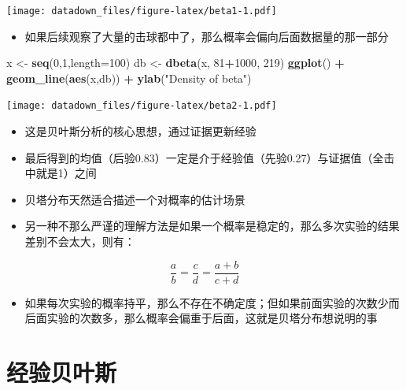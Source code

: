 \documentclass[]{book}
\newenvironment{Shaded}{\begin{snugshade}}{\end{snugshade}}
\newcommand{\DataTypeTok}[1]{\textcolor[rgb]{0.13,0.29,0.53}{#1}}
\newcommand{\DecValTok}[1]{\textcolor[rgb]{0.00,0.00,0.81}{#1}}
\newcommand{\KeywordTok}[1]{\textcolor[rgb]{0.13,0.29,0.53}{\textbf{#1}}}
\newcommand{\NormalTok}[1]{#1}
\newcommand{\OperatorTok}[1]{\textcolor[rgb]{0.81,0.36,0.00}{\textbf{#1}}}
\newcommand{\StringTok}[1]{\textcolor[rgb]{0.31,0.60,0.02}{#1}}
\providecommand{\tightlist}{%
  \setlength{\itemsep}{0pt}\setlength{\parskip}{0pt}}
\begin{document}
\texttt{[image: datadown\_files/figure-latex/beta1-1.pdf]}

\begin{itemize}
\tightlist
\item
  如果后续观察了大量的击球都中了，那么概率会偏向后面数据量的那一部分
\end{itemize}

\begin{Shaded}
\begin{Highlighting}[]
\NormalTok{x <-}\StringTok{ }\KeywordTok{seq}\NormalTok{(}\DecValTok{0}\NormalTok{,}\DecValTok{1}\NormalTok{,}\DataTypeTok{length=}\DecValTok{100}\NormalTok{)}
\NormalTok{db <-}\StringTok{ }\KeywordTok{dbeta}\NormalTok{(x, }\DecValTok{81}\OperatorTok{+}\DecValTok{1000}\NormalTok{, }\DecValTok{219}\NormalTok{)}
\KeywordTok{ggplot}\NormalTok{() }\OperatorTok{+}\StringTok{ }\KeywordTok{geom_line}\NormalTok{(}\KeywordTok{aes}\NormalTok{(x,db)) }\OperatorTok{+}\StringTok{ }\KeywordTok{ylab}\NormalTok{(}\StringTok{"Density of beta"}\NormalTok{)}
\end{Highlighting}
\end{Shaded}

\texttt{[image: datadown\_files/figure-latex/beta2-1.pdf]}

\begin{itemize}
\item
  这是贝叶斯分析的核心思想，通过证据更新经验
\item
  最后得到的均值（后验0.83）一定是介于经验值（先验0.27）与证据值（全击中就是1）之间
\item
  贝塔分布天然适合描述一个对概率的估计场景
\item
  另一种不那么严谨的理解方法是如果一个概率是稳定的，那么多次实验的结果差别不会太大，则有：
\end{itemize}

\[\frac{a}{b} = \frac{c}{d} = \frac{a+b}{c+d}\]

\begin{itemize}
\tightlist
\item
  如果每次实验的概率持平，那么不存在不确定度；但如果前面实验的次数少而后面实验的次数多，那么概率会偏重于后面，这就是贝塔分布想说明的事
\end{itemize}

\hypertarget{ux7ecfux9a8cux8d1dux53f6ux65af}{%
\section{经验贝叶斯}\label{ux7ecfux9a8cux8d1dux53f6ux65af}}
\end{document}
